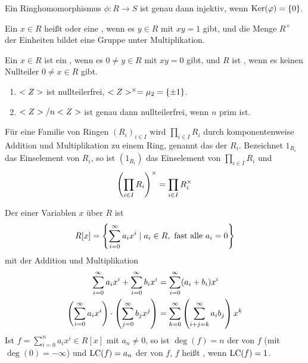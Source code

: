 \begin{proposition}
	Ein Ringhomomorphismus $\phi: R \to S$ ist genau dann injektiv, wenn $\operatorname{Ker}(\varphi) =\{0\}$.
\end{proposition}

\begin{definition}
	Ein $x \in R$ heißt  oder eine , wenn es $y\in R$ mit $xy=1$ gibt, und die Menge $R^{\times}$ der Einheiten bildet eine Gruppe unter Multiplikation.
	
	Ein $x \in R$ ist ein , wenn es $0 \neq y \in R$ mit $xy=0$ gibt, und $R$ ist , wenn es keinen Nullteiler $0\neq x \in R$ gibt.
\end{definition}

\begin{example}
	\begin{enumerate}[label=(\alph*)]
		\item $<Z>$ ist nullteilerfrei, $<Z>^{\times} = \mu_2 = \{ \pm 1 \}$.
		\item $<Z> / n <Z>$ ist genau dann nullteilerfrei, wenn $n$ prim ist.
	\end{enumerate}
\end{example}

\begin{example}
	Für eine Familie von Ringen $(R_i)_{i \in I}$ wird $\prod_{i \in I} R_i$ durch komponentenweise Addition und Multiplikation zu einem Ring, genannt das  der $R_i$. Bezeichnet $1_{R_i}$ das Einselement von $R_i$, so ist $(1_{R_i})$ das Einselement von $\prod_{i \in I} R_i$ und 
	\begin{align}
		\left(\prod_{i\in I} R_i\right)^{\times} = \prod_{i \in I}R_i^\times \notag
	\end{align}
\end{example}

\begin{example}
	Der  einer Variablen $x$ über $R$ ist 
	\begin{align}
		R[x] = \left\{ \sum_{i=0}^{\infty} a_i x^i \mid a_i \in R, \text{ fast alle } a_i = 0\right\} \notag
	\end{align}
	mit der Addition und Multiplikation
	\begin{align}
		\sum_{i=0}^{\infty} a_i x^i + \sum_{i=0}^{\infty} b_i x^i &= \sum_{i=0}^{\infty} (a_i + b_i) x^i \notag \\
		\left(\sum_{i=0}^{\infty} a_i x^i\right) \cdot \left(\sum_{j=0}^{\infty} b_j x^j\right) &= \sum_{k=0}^{\infty} \left(\sum_{i+j=k}^{\infty} a_i b_j\right) x^k \notag
	\end{align}
	Ist $f = \sum_{i=0}^n a_i x^i \in R[x]$ mit $a_n \neq 0$, so ist $\deg(f) = n$ der  von $f$ (mit $\deg(0) = -\infty$) und $\operatorname{LC}(f) = a_n$ der  von $f$, $f$ heißt , wenn $\operatorname{LC}(f) = 1$.
\end{example}

